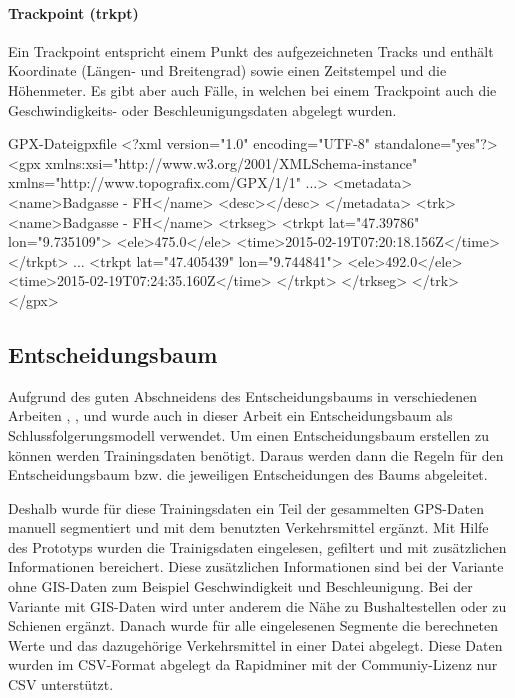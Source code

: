 \paragraph{Trackpoint (trkpt)}
Ein Trackpoint entspricht einem Punkt des aufgezeichneten Tracks und enthält Koordinate (Längen- und Breitengrad) sowie einen Zeitstempel und die Höhenmeter. Es gibt aber auch Fälle, in welchen bei einem Trackpoint auch die Geschwindigkeits- oder Beschleunigungsdaten abgelegt wurden.
 

\begin{code}[xml]{GPX-Datei}{gpxfile}
<?xml version="1.0" encoding="UTF-8" standalone="yes"?>
<gpx xmlns:xsi="http://www.w3.org/2001/XMLSchema-instance" xmlns="http://www.topografix.com/GPX/1/1" ...>
    <metadata>
        <name>Badgasse - FH</name>
        <desc></desc>
    </metadata>
    <trk>
        <name>Badgasse - FH</name>
        <trkseg>
            <trkpt lat="47.39786" lon="9.735109">
                <ele>475.0</ele>
                <time>2015-02-19T07:20:18.156Z</time>
            </trkpt>
            ...
            <trkpt lat="47.405439" lon="9.744841">
                <ele>492.0</ele>
                <time>2015-02-19T07:24:35.160Z</time>
            </trkpt>
        </trkseg>
    </trk>
</gpx>
\end{code}

\subsection{Entscheidungsbaum}
Aufgrund des guten Abschneidens des Entscheidungsbaums in verschiedenen Arbeiten  \cite{stenneth_transportation_2011}, \cite{reddy_using_2010}, \cite{sebastian_nagel_moglichkeitsstudie_2011}und \cite{zheng_learning_2008} wurde auch in dieser Arbeit ein Entscheidungsbaum als Schlussfolgerungsmodell verwendet. Um einen Entscheidungsbaum erstellen zu können werden Trainingsdaten benötigt. Daraus werden dann die Regeln für den Entscheidungsbaum bzw. die jeweiligen Entscheidungen des Baums abgeleitet.

Deshalb wurde für diese Trainingsdaten ein Teil der gesammelten GPS-Daten manuell segmentiert und mit dem benutzten Verkehrsmittel ergänzt. Mit Hilfe des Prototyps wurden die Trainigsdaten eingelesen, gefiltert und mit zusätzlichen Informationen bereichert. Diese zusätzlichen Informationen sind bei der Variante ohne GIS-Daten zum Beispiel Geschwindigkeit und Beschleunigung. Bei der Variante mit GIS-Daten wird unter anderem die Nähe zu Bushaltestellen oder zu Schienen ergänzt. Danach wurde für alle eingelesenen Segmente die berechneten Werte und das dazugehörige Verkehrsmittel in einer Datei abgelegt. Diese Daten wurden im CSV-Format abgelegt da Rapidminer mit der Communiy-Lizenz nur CSV unterstützt.

